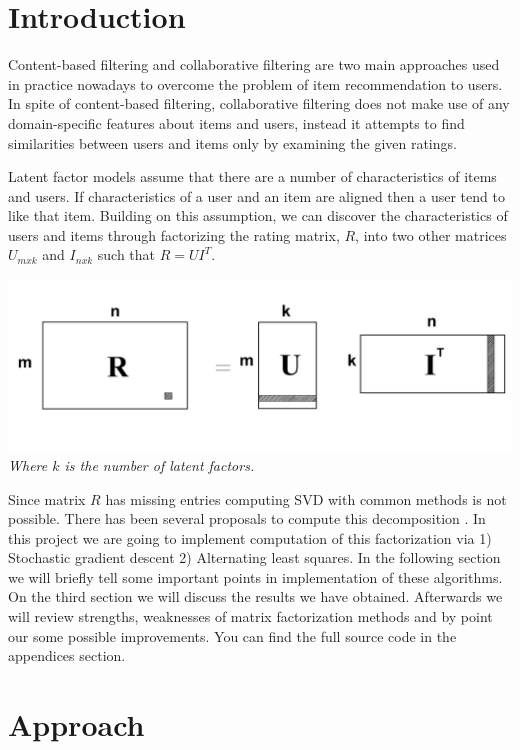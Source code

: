 \documentclass[11pt]{article}
\begin{document}
\begin{multicols}{2}	
	\section{Introduction}
	Content-based filtering and collaborative filtering are two main approaches used in practice nowadays to overcome the problem of item recommendation to users. In spite of content-based filtering, collaborative filtering does not make use of any domain-specific features about items and users, instead it attempts to find similarities between users and items only by examining the given ratings.
	

		
	Latent factor models assume that there are a number of characteristics of items and users. If characteristics of a user and an item are aligned then a user tend to like that item. Building on this assumption, we can discover the characteristics of users and items through factorizing the rating matrix, $R$, into two other matrices $U_{mxk}$ and $I_{nxk}$ such that $R = U I^T$.	 \\
	\begin{center}
		\includegraphics[width=0.8\columnwidth]{buff5/decomp}\\		
		\textit{Where $k$ is the number of latent factors.}
	\end{center}	
	Since matrix $R$ has missing entries computing SVD with common methods is not possible. There has been several proposals to compute this decomposition \cite{mnih,koren}. In this project we are going to implement computation of this factorization via 1) Stochastic gradient descent 2) Alternating least squares. In the following section we will briefly tell some important points in implementation of these algorithms. On the third section we will discuss the results we have obtained. Afterwards we will review strengths, weaknesses of matrix factorization methods and by point our some possible improvements. You can find the full source code in the appendices section.
		
	\section{Approach}

\end{multicols}
\end{document}
